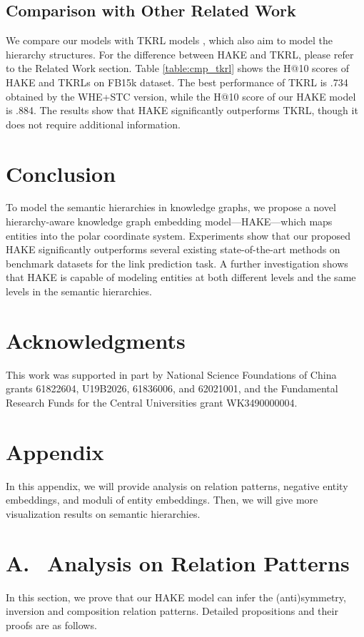 \documentclass[letterpaper]{article} \usepackage{aaai20}  \usepackage{times}  \usepackage{helvet} \usepackage{courier}  \usepackage[hyphens]{url}  \usepackage{graphicx} \urlstyle{rm} \def\UrlFont{\rm}  \usepackage{graphicx}  \frenchspacing  \setlength{\pdfpagewidth}{8.5in}  \setlength{\pdfpageheight}{11in}
\newcommand{\citep}{\cite}
\begin{document}
\subsection{Comparison with Other Related Work}
We compare our models with TKRL models \citep{hType}, which also aim to model the hierarchy structures. For the difference between HAKE and TKRL, please refer to the Related Work section.  Table \ref{table:cmp_tkrl} shows the H@10 scores of HAKE and TKRLs on FB15k dataset. The best performance of TKRL is .734 obtained by the WHE+STC version, while the H@10 score of our HAKE model is .884. The results show that HAKE significantly outperforms TKRL, though it does not require additional information.

\section{Conclusion}
To model the semantic hierarchies in knowledge graphs, we propose a novel hierarchy-aware knowledge graph embedding model---HAKE---which maps entities into the polar coordinate system. Experiments show that our proposed HAKE significantly outperforms several existing state-of-the-art methods on benchmark datasets for the link prediction task. A further investigation shows that HAKE is capable of modeling entities at both different levels and the same levels in the semantic hierarchies.

\section*{Acknowledgments}
This work was supported in part by National Science Foundations of China grants 61822604, U19B2026, 61836006, and 62021001, and the Fundamental Research Funds for the Central Universities grant WK3490000004.




\newpage
\section*{Appendix}
In this appendix, we will provide analysis on relation patterns, negative entity embeddings, and moduli of entity embeddings. Then, we will give more visualization results on semantic hierarchies.

\section*{A.\,\,\, Analysis on Relation Patterns}
In this section, we prove that our HAKE model can infer the (anti)symmetry, inversion and composition relation patterns. Detailed propositions and their proofs are as follows.
\end{document}
